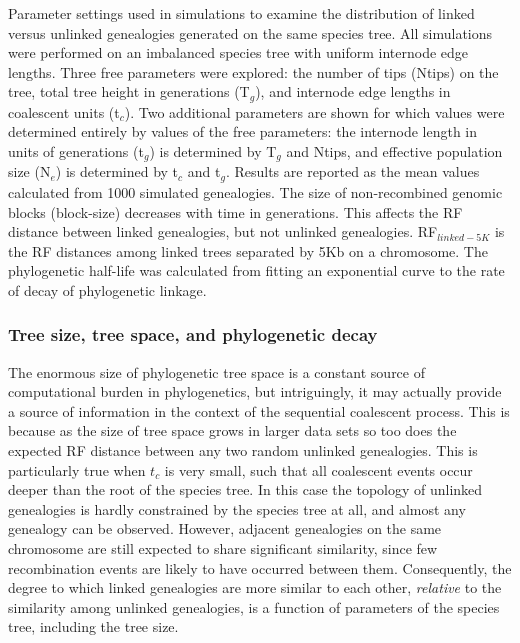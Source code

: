 \documentclass[11pt]{article}
\begin{document}
\begin{table}
\begin{center}
\end{center}
\caption{
	Parameter settings used in simulations to examine the distribution of 
	linked versus unlinked genealogies generated on the same species tree.
	All simulations were performed on an imbalanced species tree with uniform 
	internode edge lengths. Three free parameters were explored: the number of tips (Ntips)
	on the tree, total tree height in generations (T$_g$), and internode edge lengths
	in coalescent units (t$_c$). Two additional parameters are shown for which 
	values were determined entirely by values of the free parameters: the internode length
	in units of generations (t$_g$) is determined by T$_g$ and Ntips, 
	and effective population size (N$_e$) is determined by t$_c$ and t$_g$. 
	Results are reported as the mean values calculated from 1000 simulated 
	genealogies. The size of non-recombined genomic	blocks (block-size) decreases with time in generations. This affects the RF distance between linked genealogies, but not unlinked genealogies. RF$_{linked-5K}$ is the RF distances among linked trees separated by 5Kb on a chromosome. The phylogenetic half-life was calculated from fitting an exponential curve to the rate of decay of phylogenetic linkage.
}
\end{table}

\subsubsection{Tree size, tree space, and phylogenetic decay}
The enormous size of phylogenetic tree space is a constant source of computational burden in phylogenetics, but intriguingly, it may actually provide a source of information in the context of the sequential coalescent process. This is because as the size of tree space grows in larger data sets so too does the expected RF distance between any two random unlinked genealogies. This is particularly true when $t_c$ is very small, such that all coalescent events occur deeper than the root of the species tree. In this case the topology of unlinked genealogies is hardly constrained by the species tree at all, and almost any genealogy can be observed. However, adjacent genealogies on the same chromosome are still expected to share significant similarity, since few recombination events are likely to have occurred between them.  Consequently, the degree to which linked genealogies are more similar to each other, \emph{relative} to the similarity among unlinked genealogies, is a function of parameters of the species tree, including the tree size.
\end{document}
